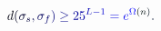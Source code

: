 \documentclass[12pt]{article}
\begin{document}
\makeatletter
\renewcommand*{\@textcolor}[3]{%
  \protect\leavevmode
  \begingroup
    \color#1{#2}#3%
  \endgroup
}
\makeatother
\begin{displaymath}
\mathcolor[RGB]{0,0,15}{d} \mathcolor[RGB]{0,0,30}{(} \mathcolor[RGB]{0,0,45}{\sigma} _ { \mathcolor[RGB]{0,0,60}{s} } \mathcolor[RGB]{0,0,75}{,} \mathcolor[RGB]{0,0,90}{\sigma} _ { \mathcolor[RGB]{0,0,105}{f} } \mathcolor[RGB]{0,0,120}{)} \mathcolor[RGB]{0,0,135}{\geq} \mathcolor[RGB]{0,0,150}{2} \mathcolor[RGB]{0,0,165}{5} ^ { \mathcolor[RGB]{0,0,180}{L} \mathcolor[RGB]{0,0,195}{-} \mathcolor[RGB]{0,0,210}{1} } \mathcolor[RGB]{0,0,225}{=} \mathcolor[RGB]{0,0,240}{e} ^ { \mathcolor[RGB]{0,0,255}{\Omega} \mathcolor[RGB]{0,15,0}{(} \mathcolor[RGB]{0,15,15}{n} \mathcolor[RGB]{0,15,30}{)} } \mathcolor[RGB]{0,15,45}{.}
\end{displaymath}
\end{document}
